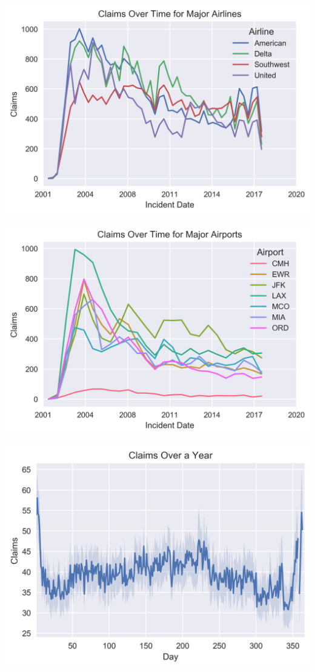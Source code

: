 \documentclass{beamer}
\begin{document}
\begin{frame}
	\includegraphics[keepaspectratio, width = \textwidth, height = \textheight]{../plots/by_airline}
\end{frame}

\begin{frame}
	\includegraphics[keepaspectratio, width = \textwidth, height = \textheight]{../plots/by_airport}
\end{frame}

\begin{frame}
	\includegraphics[keepaspectratio, width = \textwidth, height = \textheight]{../plots/avg_year_day}
\end{frame}
\end{document}
